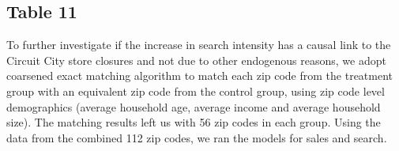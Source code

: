 \documentclass{article}
\begin{document}
\subsection{Table 11}
To further investigate if the increase in search intensity has a
causal link to the Circuit City store closures and not due to 
other endogenous reasons, we adopt coarsened exact matching
algorithm to match each zip code from
the treatment group with an equivalent zip code from the
control group, using zip code level demographics (average
household age, average income and average household size).
The matching results left us with 56 zip codes in each group.
Using the data from the combined 112 zip codes, we ran the
models for sales and search.
\begin{table}[!htbp] \centering 
	\caption{Results of the Online Sales and Search Effect After Matching Zip Codes: TotalMonthlySales, PagesPerDollar, and MinsPerDollar (All Product Categories)} 
	\label{tab:table11} 
\end{table}
\end{document}

